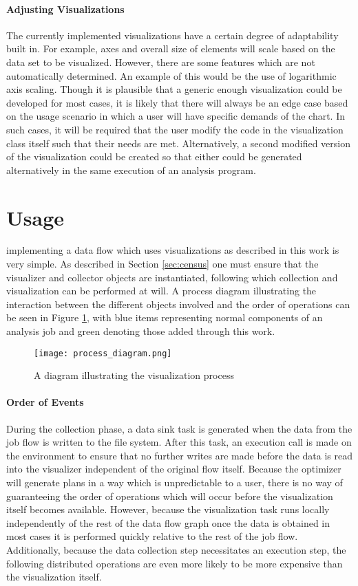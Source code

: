 \paragraph{Adjusting Visualizations}
The currently implemented visualizations have a certain degree of adaptability built in. For example, axes and overall size of elements will scale based on the data set to be visualized. However, there are some features which are not automatically determined. An example of this would be the use of logarithmic axis scaling. Though it is plausible that a generic enough visualization could be developed for most cases, it is likely that there will always be an edge case based on the usage scenario in which a user will have specific demands of the chart. In such cases, it will be required that the user modify the code in the visualization class itself such that their needs are met. Alternatively, a second modified version of the visualization could be created so that either could be generated alternatively in the same execution of an analysis program. 

\section{Usage}
\label{usage}
 implementing a data flow which uses visualizations as described in this work is very simple. As described in Section \ref{sec:census} one must ensure that the visualizer and collector objects are instantiated, following which collection and visualization can be performed at will. A process diagram illustrating the interaction between the different objects involved and the order of operations can be seen in Figure \ref{fig:process}, with blue items representing normal components of an analysis job and green denoting those added through this work.

\begin{figure}
	\centering
	\texttt{[image: process\_diagram.png]}
	\caption{A diagram illustrating the visualization process}
	\label{fig:process}
\end{figure}

\paragraph{Order of Events}
During the collection phase, a data sink task is generated when the data from the job flow is written to the file system. After this task, an execution call is made on the environment to ensure that no further writes are made before the data is read into the visualizer independent of the original flow itself. Because the optimizer will generate plans in a way which is unpredictable to a user, there is no way of guaranteeing the order of operations which will occur before the visualization itself becomes available. However, because the visualization task runs locally independently of the rest of the data flow graph once the data is obtained in most cases it is performed quickly relative to the rest of the job flow. Additionally, because the data collection step necessitates an execution step, the following distributed operations are even more likely to be more expensive than the visualization itself.

